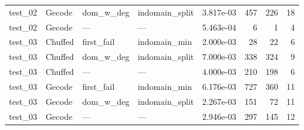 \begin{compactfloats}
\begin{table}[H]
\begin{tabular}{l l l l r r r r}
    test\_02 & Gecode  & dom\_w\_deg  & indomain\_split & 3.817e-03 & 457  & 226 & 18 \\
    test\_02 & Gecode  & ---          & ---              & 5.463e-04 & 6    & 1   & 4 \\
    \midrule
    test\_03 & Chuffed & first\_fail  & indomain\_min   & 2.000e-03 & 28  & 22  & 6 \\
    test\_03 & Chuffed & dom\_w\_deg  & indomain\_split & 7.000e-03 & 338 & 324 & 9 \\
    test\_03 & Chuffed & ---          & ---              & 4.000e-03 & 210 & 198 & 6 \\
    test\_03 & Gecode  & first\_fail  & indomain\_min   & 6.176e-03 & 727 & 360 & 11 \\
    test\_03 & Gecode  & dom\_w\_deg  & indomain\_split & 2.267e-03 & 151 & 72  & 11 \\
    test\_03 & Gecode  & ---          & ---              & 2.946e-03 & 297 & 145 & 12 \\
    \bottomrule
  \end{tabular}
\end{table}
\end{compactfloats}

\FloatBarrier
